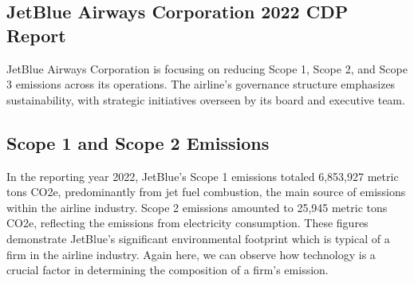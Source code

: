 
\subsection{JetBlue Airways Corporation 2022 CDP Report}
JetBlue Airways Corporation is  focusing on reducing Scope 1, Scope 2, and Scope 3 emissions across its operations. The airline's governance structure emphasizes sustainability, with strategic initiatives overseen by its board and executive team.

\subsection*{Scope 1 and Scope 2 Emissions}
In the reporting year 2022, JetBlue's Scope 1 emissions totaled 6,853,927 metric tons CO2e, predominantly from jet fuel combustion, the main source of emissions within the airline industry. Scope 2 emissions amounted to 25,945 metric tons CO2e, reflecting the emissions from electricity consumption. These figures demonstrate JetBlue's significant environmental footprint which is typical of a firm in the airline industry. Again here, we can observe how technology is a crucial factor in determining the composition of a firm's emission.

